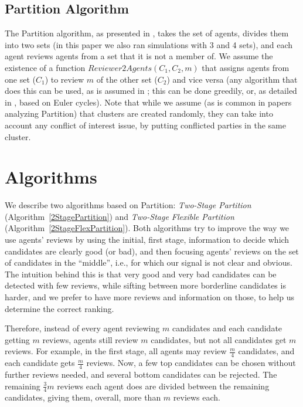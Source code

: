 \documentclass[letterpaper]{article} %
\begin{document}
\subsection{Partition Algorithm}
The Partition algorithm, as presented in \citet{AFPT11}, takes the set of agents, divides them into two sets (in this paper we also ran simulations with 3 and 4 sets), and each agent reviews agents from a set that it is not a member of. %
We assume the existence of a function $Reviewer2Agents(C_{1},C_{2},m)$ that assigns agents from one set ($C_{1}$) to review $m$ of the other set ($C_{2}$) and vice versa (any algorithm that does this can be used, as is assumed in \citet{ALMRW16,ALMRW19}; this can be done greedily, or, as detailed in \citet{LMTZ23}, based on Euler cycles). Note that while we assume (as is common in papers analyzing Partition) that clusters are created randomly, they can take into account any conflict of interest issue, by putting conflicted parties in the same cluster.




\section{Algorithms}\label{algos}
We describe two algorithms based on Partition: \emph{Two-Stage Partition} (Algorithm~\ref{2StagePartition}) and \emph{Two-Stage Flexible Partition} (Algorithm~\ref{2StageFlexPartition}). Both algorithms try to improve the way we use agents' reviews by using the initial, first stage, information to decide which candidates are clearly good (or bad), and then focusing agents' reviews on the set of candidates in the ``middle'', i.e., for which our signal is not clear and obvious. The intuition behind this is that very good and very bad candidates can be detected with few reviews, while sifting between more borderline candidates is harder, and we prefer to have more reviews and information on those, to help us determine the correct ranking.

Therefore, instead of every agent reviewing $m$ candidates and each candidate getting $m$ reviews, agents still review $m$ candidates, but not all candidates get $m$ reviews. For example, in the first stage, all agents may review $\frac{m}{4}$ candidates, and each candidate gets $\frac{m}{4}$ reviews. Now, a few top candidates can be chosen without further reviews needed, and several bottom candidates can be rejected. The remaining $\frac{3}{4}m$ reviews each agent does are divided between the remaining candidates, giving them, overall, more than $m$ reviews each.
\end{document}
